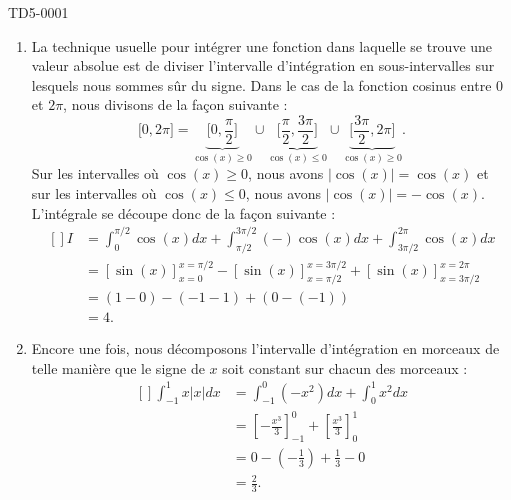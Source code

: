 
\begin{corrige}{TD5-0001}

	\begin{enumerate}
		\item
			La technique usuelle pour intégrer une fonction dans laquelle se trouve une valeur absolue est de diviser l'intervalle d'intégration en sous-intervalles sur lesquels nous sommes sûr du signe. Dans le cas de la fonction cosinus entre $0$ et $2\pi$, nous divisons de la façon suivante :
			\begin{equation}
				\mathopen[ 0 , 2\pi \mathclose]=\underbrace{\mathopen[ 0 , \frac{ \pi }{2} \mathclose]}_{\cos(x)\geq 0}\cup\underbrace{\mathopen[ \frac{ \pi }{2} , \frac{ 3\pi }{2} \mathclose]}_{\cos(x)\leq 0}\cup\underbrace{\mathopen[ \frac{ 3\pi }{2} , 2\pi \mathclose]}_{\cos(x)\geq 0}.
			\end{equation}
			Sur les intervalles où $\cos(x)\geq 0$, nous avons $| \cos(x) |=\cos(x)$ et sur les intervalles où $\cos(x)\leq 0$, nous avons $| \cos(x) |=-\cos(x)$. L'intégrale se découpe donc de la façon suivante :
			\begin{equation}
				\begin{aligned}[]
					I&=\int_{0}^{\pi/2}\cos(x)dx+\int_{\pi/2}^{3\pi/2}(-)\cos(x)dx+\int_{3\pi/2}^{2\pi}\cos(x)dx\\
					&=[\sin(x)]_{x=0}^{x=\pi/2}-[\sin(x)]_{x=\pi/2}^{x=3\pi/2}+[\sin(x)]_{x=3\pi/2}^{x=2\pi}\\
					&=(1-0)-(-1-1)+(0-(-1))\\
					&=4.
				\end{aligned}
			\end{equation}
		\item
			Encore une fois, nous décomposons l'intervalle d'intégration en morceaux de telle manière que le signe de $x$ soit constant sur chacun des morceaux :
			\begin{equation}
				\begin{aligned}[]
					\int_{-1}^1x| x |dx&=\int_{-1}^0(-x^2)dx+\int_0^1x^2dx\\
					&=\left[ -\frac{ x^3 }{ 3 } \right]_{-1}^0+\left[ \frac{ x^3 }{ 3 } \right]_0^1\\
					&=0-\left( -\frac{ 1 }{ 3 } \right)+\frac{1}{ 3 }-0\\
					&=\frac{ 2 }{ 3 }.
				\end{aligned}

\end{equation}
\end{enumerate}
\end{corrige}
